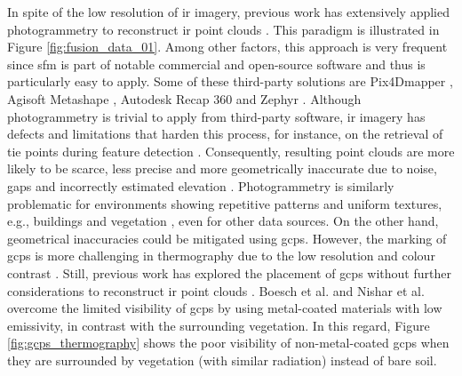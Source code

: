 In spite of the low resolution of \acrshort{ir} imagery, previous work has extensively applied photogrammetry to reconstruct \acrshort{ir} point clouds \cite{dahaghin_precise_2021, dahaghin_3d_2019, gonzalez_thermal_2019, grechi_3d_2021, webster_three-dimensional_2018, sledz_thermal_2018, kniaz_thermal_2018, hoegner_mobile_2018, zheng_thermal_2020, guilbert_fusion_2020}. This paradigm is illustrated in Figure \ref{fig:fusion_data_01}. Among other factors, this approach is very frequent since \acrshort{sfm} is part of notable commercial and open-source software and thus is particularly easy to apply. Some of these third-party solutions are Pix4Dmapper \cite{zheng_thermal_2020}, Agisoft Metashape \cite{grechi_3d_2021, guilbert_fusion_2020, lin_fusion_2019, macher_combination_2019}, Autodesk Recap 360 \cite{lafi_3d_2017} and Zephyr \cite{maset_photogrammetric_2017, clarkson_thermal_2017}. Although photogrammetry is trivial to apply from third-party software, \acrshort{ir} imagery has defects and limitations that harden this process, for instance, on the retrieval of tie points during feature detection \cite{lin_fusion_2019}. Consequently, resulting point clouds are more likely to be scarce, less precise and more geometrically inaccurate due to noise, gaps and incorrectly estimated elevation \cite{kong_3-d_2018}. Photogrammetry is similarly problematic for environments showing repetitive patterns and uniform textures, e.g., buildings and vegetation \cite{lin_fusion_2019, jarzabek-rychard_supervised_2020}, even for other data sources. On the other hand, geometrical inaccuracies could be mitigated using \acrshort{gcp}s. However, the marking of \acrshort{gcp}s is more challenging in thermography due to the low resolution and colour contrast \cite{sledz_thermal_2018}. Still, previous work has explored the placement of \acrshort{gcp}s without further considerations to reconstruct \acrshort{ir} point clouds \cite{dahaghin_precise_2021, gonzalez_thermal_2019, zheng_thermal_2020, sledz_thermal_2018}. Boesch et al. \cite{boesch_thermal_2017} and Nishar et al. \cite{nishar_thermal_2016} overcome the limited visibility of \acrshort{gcp}s by using metal-coated materials with low emissivity, in contrast with the surrounding vegetation. In this regard, Figure \ref{fig:gcps_thermography} shows the poor visibility of non-metal-coated \acrshort{gcp}s when they are surrounded by vegetation (with similar radiation) instead of bare soil. 

